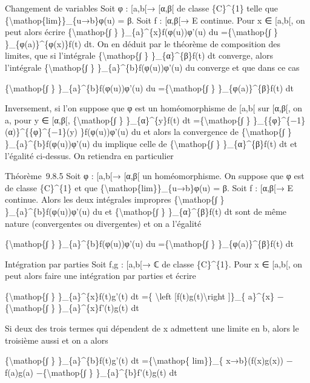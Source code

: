 \documentclass[]{article}
\begin{document}
Changement de variables Soit φ : {[}a,b{[}→ {[}α,β{[} de classe
\{C\}\^{}\{1\} telle que \{\textbackslash{}mathop\{lim\}\}\_\{u→b\}φ(u)
= β. Soit f : {[}α,β{[}→ E continue. Pour x ∈ {[}a,b{[}, on peut alors
écrire \{\textbackslash{}mathop\{∫ \} \}\_\{a\}\^{}\{x\}f(φ(u))φ'(u) du
=\{\textbackslash{}mathop\{∫ \} \}\_\{φ(a)\}\^{}\{φ(x)\}f(t) dt. On en
déduit par le théorème de composition des limites, que si l'intégrale
\{\textbackslash{}mathop\{∫ \} \}\_\{α\}\^{}\{β\}f(t) dt converge, alors
l'intégrale \{\textbackslash{}mathop\{∫ \}
\}\_\{a\}\^{}\{b\}f(φ(u))φ'(u) du converge et que dans ce cas

\{\textbackslash{}mathop\{∫ \} \}\_\{a\}\^{}\{b\}f(φ(u))φ'(u) du
=\{\textbackslash{}mathop\{∫ \} \}\_\{φ(a)\}\^{}\{β\}f(t) dt

Inversement, si l'on suppose que φ est un homéomorphisme de {[}a,b{[}
sur {[}α,β{[}, on a, pour y ∈ {[}α,β{[}, \{\textbackslash{}mathop\{∫ \}
\}\_\{α\}\^{}\{y\}f(t) dt =\{\textbackslash{}mathop\{∫ \}
\}\_\{\{φ\}\^{}\{−1\}(α)\}\^{}\{\{φ\}\^{}\{−1\}(y) \}f(φ(u))φ'(u) du et
alors la convergence de \{\textbackslash{}mathop\{∫ \}
\}\_\{a\}\^{}\{b\}f(φ(u))φ'(u) du implique celle de
\{\textbackslash{}mathop\{∫ \} \}\_\{α\}\^{}\{β\}f(t) dt et l'égalité
ci-dessus. On retiendra en particulier

Théorème~9.8.5 Soit φ : {[}a,b{[}→ {[}α,β{[} un homéomorphisme. On
suppose que φ est de classe \{C\}\^{}\{1\} et que
\{\textbackslash{}mathop\{lim\}\}\_\{u→b\}φ(u) = β. Soit f : {[}α,β{[}→
E continue. Alors les deux intégrales impropres
\{\textbackslash{}mathop\{∫ \} \}\_\{a\}\^{}\{b\}f(φ(u))φ'(u) du et
\{\textbackslash{}mathop\{∫ \} \}\_\{α\}\^{}\{β\}f(t) dt sont de même
nature (convergentes ou divergentes) et on a l'égalité

\{\textbackslash{}mathop\{∫ \} \}\_\{a\}\^{}\{b\}f(φ(u))φ'(u) du
=\{\textbackslash{}mathop\{∫ \} \}\_\{φ(a)\}\^{}\{β\}f(t) dt

Intégration par parties Soit f,g : {[}a,b{[}→ ℂ de classe
\{C\}\^{}\{1\}. Pour x ∈ {[}a,b{[}, on peut alors faire une intégration
par parties et écrire

\{\textbackslash{}mathop\{∫ \} \}\_\{a\}\^{}\{x\}f(t)g'(t) dt =\{
\textbackslash{}left {[}f(t)g(t)\textbackslash{}right {]}\}\_\{
a\}\^{}\{x\} −\{\textbackslash{}mathop\{∫ \} \}\_\{a\}\^{}\{x\}f'(t)g(t)
dt

Si deux des trois termes qui dépendent de x admettent une limite en b,
alors le troisième aussi et on a alors

\{\textbackslash{}mathop\{∫ \} \}\_\{a\}\^{}\{b\}f(t)g'(t) dt
=\{\textbackslash{}mathop\{ lim\}\}\_\{ x→b\}(f(x)g(x)) − f(a)g(a)
−\{\textbackslash{}mathop\{∫ \} \}\_\{a\}\^{}\{b\}f'(t)g(t) dt
\end{document}
